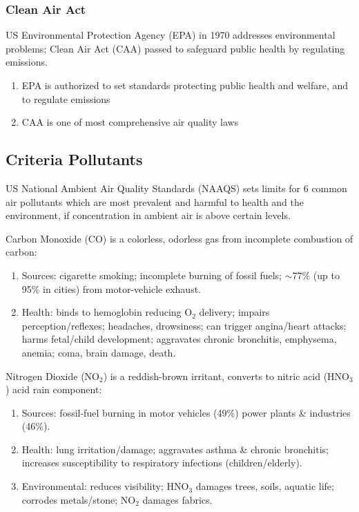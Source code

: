\documentclass[12pt, a4paper]{article}
\begin{document}
\begin{multicols*}{3}
\subsubsection{Clean Air Act}

US Environmental Protection Agency (EPA) in 1970 addresses environmental problems; Clean Air Act (CAA) passed to safeguard public health by regulating emissions.
\begin{enumerate}[\roman*.]
  \item EPA is authorized to set standards protecting public health and welfare, and to regulate emissions
  \item CAA is one of most comprehensive air quality laws
\end{enumerate}
\vspace{-1em}
\colbreak
\subsection{Criteria Pollutants}

US National Ambient Air Quality Standards (NAAQS) sets limits for 6 common air pollutants which are most prevalent and harmful to health and the environment, if concentration in ambient air is above certain levels.

Carbon Monoxide (CO) is a colorless, odorless gas from incomplete combustion of carbon:
\begin{enumerate}[\roman*.]
  \item Sources: cigarette smoking; incomplete burning of fossil fuels; $\sim$77\% (up to 95\% in cities) from motor-vehicle exhaust.
  \item Health: binds to hemoglobin reducing O$_2$ delivery; impairs perception/reflexes; headaches, drowsiness; can trigger angina/heart attacks; harms fetal/child development; aggravates chronic bronchitis, emphysema, anemia;  coma, brain damage, death.
\end{enumerate}

Nitrogen Dioxide (NO$_2$) is a reddish-brown irritant, converts to nitric acid (HNO$_3$) acid rain component:
\begin{enumerate}[\roman*.]
  \item Sources: fossil-fuel burning in motor vehicles (49\%) power plants \& industries (46\%).
  \item Health: lung irritation/damage; aggravates asthma \& chronic bronchitis; increases susceptibility to respiratory infections (children/elderly).
  \item Environmental: reduces visibility; HNO$_3$ damages trees, soils, aquatic life; corrodes metals/stone; NO$_2$ damages fabrics.
\end{enumerate}


\end{multicols*}
\end{document}
